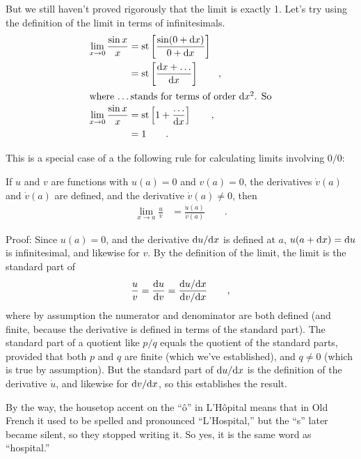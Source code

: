 But we still haven't proved rigorously that the limit is exactly 1.
Let's try using the definition of the limit in terms of
infinitesimals.
\begin{align*}
  \lim_{x\rightarrow 0} \frac{\sin x}{x} &= \text{st}\left[\frac{\sin (0+\textup{d} x)}{0+\textup{d} x}\right] \\
            &= \text{st}\left[\frac{\textup{d} x+\ldots}{\textup{d} x}\right] \qquad ,\\
\intertext{where \ldots stands for terms of order $\textup{d} x^2$. So}
  \lim_{x\rightarrow 0} \frac{\sin x}{x} &= \text{st}\left[1+\frac{\ldots}{\textup{d} x}\right] \qquad ,\\
                                         &= 1 \qquad .
\end{align*}

This is a special case of a the following rule for calculating limits involving $0/0$:

\begin{important}
If $u$ and $v$ are functions with $u(a)=0$ and $v(a)=0$, the derivatives $\dot{v}(a)$ and $\dot{v}(a)$ are defined,
and the derivative $\dot{v}(a)\ne 0$,
then
\begin{align*}
  \lim_{x\rightarrow a} \frac{u}{v} &= \frac{\dot{u}(a)}{\dot{v}(a)} \qquad .
\end{align*}
\end{important}

Proof: Since $u(a)=0$, and the derivative $\textup{d} u/\textup{d} x$ is defined at $a$, $u(a+\textup{d} x)=\textup{d} u$ is infinitesimal, and likewise for $v$. By the definition
of the limit, the limit is the standard part of
\begin{equation*}
  \frac{u}{v} = \frac{\textup{d} u}{\textup{d} v} = \frac{\textup{d} u/\textup{d} x}{\textup{d} v/\textup{d} x} \qquad ,
\end{equation*}
where by assumption the numerator and denominator are both defined (and finite, because the derivative
is defined in terms of the standard part). The standard part of a quotient like $p/q$ equals the quotient of the
standard parts, provided that both $p$ and $q$ are finite (which we've established), and $q \ne 0$ (which is
true by assumption). But the standard part of $\textup{d} u/\textup{d} x$ is the definition of the derivative $\dot{u}$, and
likewise for  $\textup{d} v/\textup{d} x$, so this establishes the result.

By the way, the housetop accent on the ``\^{o}'' in L'H\^{o}pital means that in Old French it used to be spelled and
pronounced ``L'Hospital,'' but the ``s'' later became silent, so they stopped writing it. So yes, it is the
same word as ``hospital.''

